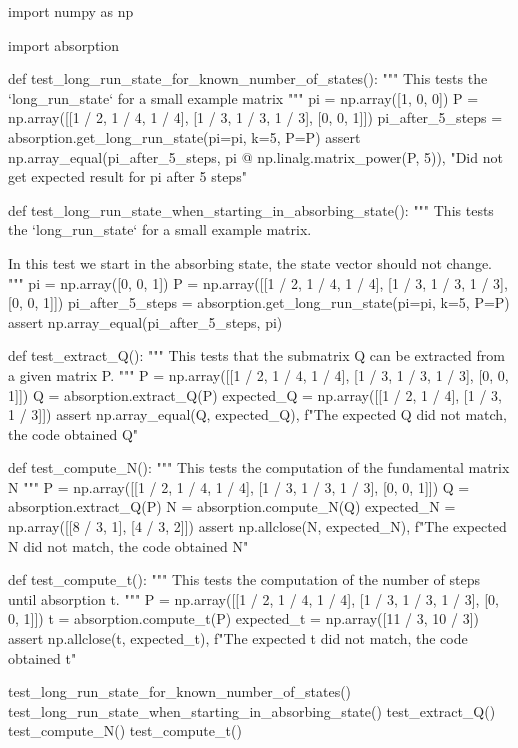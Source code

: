 \begin{python}
import numpy as np

import absorption

def test_long_run_state_for_known_number_of_states():
    """
    This tests the `long_run_state` for a small example matrix
    """
    pi = np.array([1, 0, 0])
    P = np.array([[1 / 2, 1 / 4, 1 / 4], [1 / 3, 1 / 3, 1 / 3], [0, 0, 1]])
    pi_after_5_steps = absorption.get_long_run_state(pi=pi, k=5, P=P)
    assert np.array_equal(pi_after_5_steps, pi @ np.linalg.matrix_power(P, 5)), "Did not get expected result for pi after 5 steps"


def test_long_run_state_when_starting_in_absorbing_state():
    """
    This tests the `long_run_state` for a small example matrix.

    In this test we start in the absorbing state, the state vector should not
    change.
    """
    pi = np.array([0, 0, 1])
    P = np.array([[1 / 2, 1 / 4, 1 / 4], [1 / 3, 1 / 3, 1 / 3], [0, 0, 1]])
    pi_after_5_steps = absorption.get_long_run_state(pi=pi, k=5, P=P)
    assert np.array_equal(pi_after_5_steps, pi)


def test_extract_Q():
    """
    This tests that the submatrix Q can be extracted from a given matrix P.
    """
    P = np.array([[1 / 2, 1 / 4, 1 / 4], [1 / 3, 1 / 3, 1 / 3], [0, 0, 1]])
    Q = absorption.extract_Q(P)
    expected_Q = np.array([[1 / 2, 1 / 4], [1 / 3, 1 / 3]])
    assert np.array_equal(Q, expected_Q), f"The expected Q did not match, the code obtained {Q}"


def test_compute_N():
    """
    This tests the computation of the fundamental matrix N
    """
    P = np.array([[1 / 2, 1 / 4, 1 / 4], [1 / 3, 1 / 3, 1 / 3], [0, 0, 1]])
    Q = absorption.extract_Q(P)
    N = absorption.compute_N(Q)
    expected_N = np.array([[8 / 3, 1], [4 / 3, 2]])
    assert np.allclose(N, expected_N), f"The expected N did not match, the code obtained {N}"


def test_compute_t():
    """
    This tests the computation of the number of steps until absorption t.
    """
    P = np.array([[1 / 2, 1 / 4, 1 / 4], [1 / 3, 1 / 3, 1 / 3], [0, 0, 1]])
    t = absorption.compute_t(P)
    expected_t = np.array([11 / 3, 10 / 3])
    assert np.allclose(t, expected_t), f"The expected t did not match, the code obtained {t}"


test_long_run_state_for_known_number_of_states()
test_long_run_state_when_starting_in_absorbing_state()
test_extract_Q()
test_compute_N()
test_compute_t()
\end{python}


